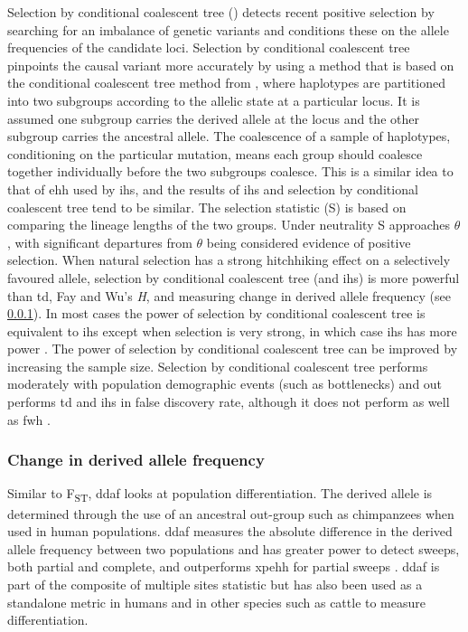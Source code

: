 \documentclass[]{report}
\begin{document}
Selection by conditional coalescent tree (\citet{Wang2014}) detects
recent positive selection by searching for an imbalance of genetic
variants and conditions these on the allele frequencies of the candidate
loci. Selection by conditional coalescent tree pinpoints the causal
variant more accurately by using a method that is based on the
conditional coalescent tree method from \citet{Wiuf1999}, where
haplotypes are partitioned into two subgroups according to the allelic
state at a particular locus. It is assumed one subgroup carries the
derived allele at the locus and the other subgroup carries the ancestral
allele. The coalescence of a sample of haplotypes, conditioning on the
particular mutation, means each group should coalesce together
individually before the two subgroups coalesce. This is a similar idea
to that of \gls{ehh} used by \gls{ihs}, and the results of \gls{ihs} and
selection by conditional coalescent tree tend to be similar. The
selection statistic (S) is based on comparing the lineage lengths of the
two groups. Under neutrality S approaches \(\theta\), with significant
departures from \(\theta\) being considered evidence of positive
selection. When natural selection has a strong hitchhiking effect on a
selectively favoured allele, selection by conditional coalescent tree
(and \gls{ihs}) is more powerful than \gls{td}, Fay and Wu's \emph{H},
and measuring change in derived allele frequency (see \ref{dafsection}).
In most cases the power of selection by conditional coalescent tree is
equivalent to \gls{ihs} except when selection is very strong, in which
case \gls{ihs} has more power \citep{Wang2014}. The power of selection
by conditional coalescent tree can be improved by increasing the sample
size. Selection by conditional coalescent tree performs moderately with
population demographic events (such as bottlenecks) and out performs
\gls{td} and \gls{ihs} in false discovery rate, although it does not
perform as well as \gls{fwh} \citep{Wang2014}.

\subsubsection{Change in derived allele frequency}\label{dafsection}

Similar to F\textsubscript{ST}, \gls{ddaf} looks at population
differentiation. The derived allele is determined through the use of an
ancestral out-group such as chimpanzees when used in human populations.
\gls{ddaf} measures the absolute difference in the derived allele
frequency between two populations \citep{Grossman2010} and has greater
power to detect sweeps, both partial and complete, and outperforms
\gls{xpehh} for partial sweeps \citep{Colonna2014}. \gls{ddaf} is part
of the composite of multiple sites statistic \citep{Grossman2010} but
has also been used as a standalone metric in humans
\citep{Colonna2014, Gudbjartsson2015} and in other species such as
cattle \citep{Randhawa2014} to measure differentiation.
\end{document}
